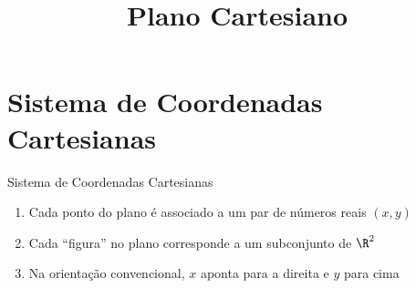 \documentclass[fleqn,utf8,aspectratio=169,12pt,ignorenonframetext]{beamer}
\title{Plano Cartesiano}
\begin{document}
\addtitle

\section{Sistema de Coordenadas Cartesianas}

\begin{frame}{Sistema de Coordenadas Cartesianas}
  \begin{enumerate}[<+->]
    \item Cada ponto do plano é associado a um par de números reais $(x, y)$
    \item Cada ``figura'' no plano corresponde a um subconjunto de $\R^2$
    \item Na orientação convencional, $x$ aponta para a direita e $y$ para cima
  \end{enumerate}
\end{frame}


\end{document}
